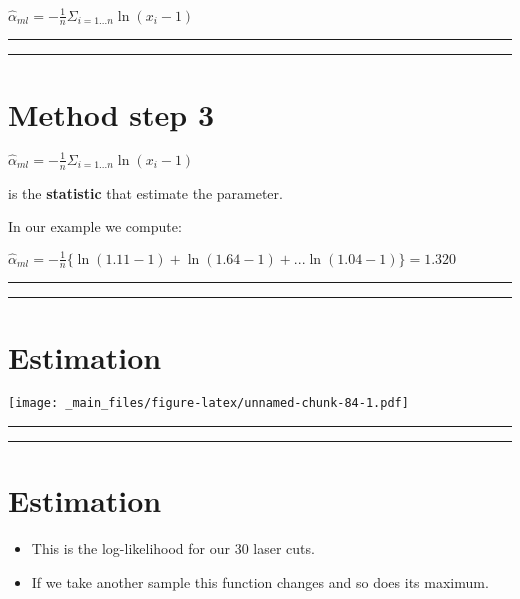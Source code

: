 \documentclass[
]{book}
\begin{document}
\(\hat{\alpha}_{ml}=-\frac{1}{n}\Sigma_{i=1...n} \ln (x_i-1)\)

\begin{center}\rule{0.5\linewidth}{0.5pt}\end{center}

\begin{center}\rule{0.5\linewidth}{0.5pt}\end{center}

\hypertarget{method-step-3-1}{%
\section{Method step 3}\label{method-step-3-1}}

\(\hat{\alpha}_{ml}=-\frac{1}{n}\Sigma_{i=1...n} \ln (x_i-1)\)

is the \textbf{statistic} that estimate the parameter.

In our example we compute:

\(\hat{\alpha}_{ml}=-\frac{1}{n}\{ \ln (1.11-1)+ \ln (1.64-1)+...\ln (1.04-1)\}=1.320\)

\begin{center}\rule{0.5\linewidth}{0.5pt}\end{center}

\begin{center}\rule{0.5\linewidth}{0.5pt}\end{center}

\hypertarget{estimation-1}{%
\section{Estimation}\label{estimation-1}}

\texttt{[image: \_main\_files/figure-latex/unnamed-chunk-84-1.pdf]}

\begin{center}\rule{0.5\linewidth}{0.5pt}\end{center}

\begin{center}\rule{0.5\linewidth}{0.5pt}\end{center}

\hypertarget{estimation-2}{%
\section{Estimation}\label{estimation-2}}

\begin{itemize}
\item
  This is the log-likelihood for our 30 laser cuts.
\item
  If we take another sample this function changes and so does its maximum.
\end{itemize}
\end{document}
